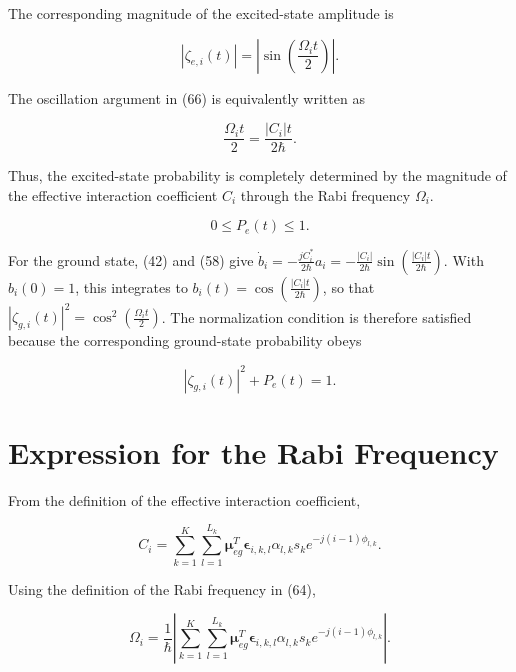\documentclass[12pt,a4paper]{article}
\begin{document}
The corresponding magnitude of the excited-state amplitude is

\begin{equation}
|\zeta_{e,i}(t)|
=
\left|\sin\left(\frac{\Omega_i t}{2}\right)\right|.
\tag{67}
\end{equation}

The oscillation argument in (66) is equivalently written as

\begin{equation}
\frac{\Omega_i t}{2}
=
\frac{|C_i|t}{2\hbar}.
\tag{68}
\end{equation}

Thus, the excited-state probability is completely determined by the magnitude of the effective interaction coefficient $C_i$ through the Rabi frequency $\Omega_i$.

\begin{equation}
0\leq P_e(t)\leq 1.
\tag{69}
\end{equation}

For the ground state, (42) and (58) give
\(\dot b_i=-\frac{jC_i^{*}}{2\hbar}a_i=-\frac{|C_i|}{2\hbar}\sin\!\left(\frac{|C_i|t}{2\hbar}\right)\).
With \(b_i(0)=1\), this integrates to \(b_i(t)=\cos\!\left(\frac{|C_i|t}{2\hbar}\right)\), so that
\(|\zeta_{g,i}(t)|^2=\cos^2\!\left(\frac{\Omega_i t}{2}\right)\).
The normalization condition is therefore satisfied because the corresponding ground-state probability obeys

\begin{equation}
|\zeta_{g,i}(t)|^2+P_e(t)=1.
\tag{70}
\end{equation}

\section{Expression for the Rabi Frequency}

From the definition of the effective interaction coefficient,

\begin{equation}
C_i
=
\sum_{k=1}^{K}
\sum_{l=1}^{L_k}
\boldsymbol{\mu}_{eg}^{T}
\boldsymbol{\epsilon}_{i,k,l}
\alpha_{l,k}s_k
 e^{-j(i-1)\phi_{l,k}}.
\tag{71}
\end{equation}

Using the definition of the Rabi frequency in (64),

\begin{equation}
\Omega_i
=
\frac{1}{\hbar}
\left|
\sum_{k=1}^{K}
\sum_{l=1}^{L_k}
\boldsymbol{\mu}_{eg}^{T}
\boldsymbol{\epsilon}_{i,k,l}
\alpha_{l,k}s_k
 e^{-j(i-1)\phi_{l,k}}
\right|.
\tag{72}
\end{equation}
\end{document}
